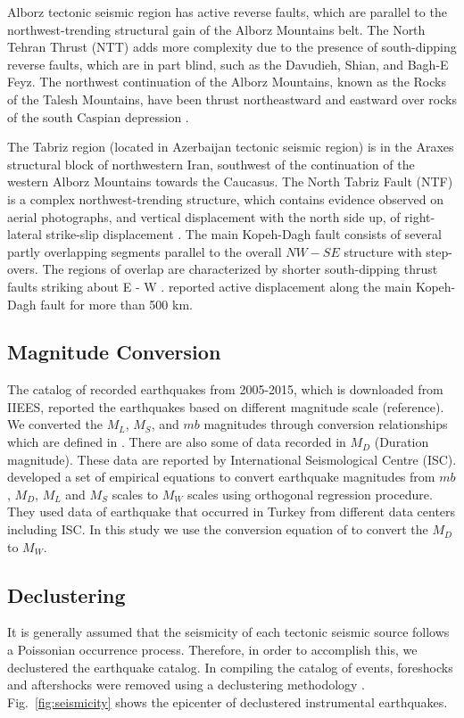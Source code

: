 \noindent
Alborz tectonic seismic region has active reverse faults, which are parallel to the northwest-trending structural gain of the Alborz Mountains belt. The North Tehran Thrust (NTT) adds more complexity due to the presence of south-dipping reverse faults, which are in part blind, such as the Davudieh, Shian, and Bagh-E Feyz.
The northwest continuation of the Alborz Mountains, known as the Rocks of the Talesh Mountains, have been thrust northeastward and eastward over rocks of the south Caspian depression \citep{Berberian1999}. 

\noindent
 The Tabriz region (located in Azerbaijan tectonic seismic region) is in the Araxes structural block of northwestern Iran, southwest of the continuation of the western Alborz Mountains towards the Caucasus. The North Tabriz Fault (NTF) is a complex northwest-trending structure, which contains evidence observed on aerial photographs, and vertical displacement with the north side up, of right-lateral strike-slip displacement \citep{Berberian1999}.
\noindent
The main Kopeh-Dagh fault consists of several partly overlapping segments parallel to the overall $NW - SE$ structure with step-overs. The regions of overlap are characterized by shorter south-dipping thrust faults striking about E - W \citep{Berberian2001}. \citet{Trifonov1978} reported active displacement along the main Kopeh-Dagh fault for more than 500 km. 

\subsection{Magnitude Conversion}
\noindent
The catalog of recorded earthquakes from 2005-2015, which is downloaded from IIEES, reported the earthquakes based on different magnitude scale (reference). We converted the $M_L$, $M_S$, and $mb$ magnitudes through conversion relationships which are defined in \citet{Zare2014}. There are also some of data recorded in $M_D$ (Duration magnitude). These data are reported by International Seismological Centre (ISC).  \citet{Deniz2010} developed a set of empirical equations to convert earthquake magnitudes from $mb$, $M_D$, $M_L$ and $M_S$ scales to $M_W$ scales using orthogonal regression procedure. They used data of earthquake that occurred in Turkey from different data centers including ISC. In this study we use the conversion equation of \citet{Deniz2010} to convert the $M_D$ to $M_W$. 

\subsection{Declustering}
\noindent
It is generally assumed that the seismicity of each tectonic seismic source follows a Poissonian occurrence process. Therefore, in order to accomplish this, we declustered the earthquake catalog. In compiling the catalog of events, foreshocks and aftershocks were removed using a declustering methodology \citet{Gardner1974}. Fig.~\ref{fig:seismicity} shows the epicenter of declustered instrumental  earthquakes.

